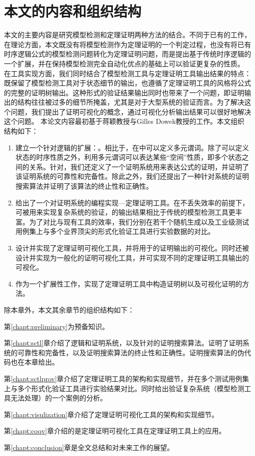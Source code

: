 \section{本文的内容和组织结构}
本文的主要内容是研究模型检测和定理证明两种方法的结合。不同于已有的工作，在理论方面，本文既没有将模型检测作为定理证明的一个判定过程，也没有将已有时序逻辑公式的模型检测问题转化为定理证明问题，而是提出基于传统时序逻辑的一个扩展，并在保持模型检测完全自动化优点的基础上可以验证更复杂的性质。
在工具实现方面，我们同时结合了模型检测工具与定理证明工具输出结果的特点：既保留了模型检测工具对于状态细节的输出，也遵循了定理证明工具的风格将公式的完整的证明树输出。这种形式的验证结果输出同时也带来了一个问题，即证明输出的结构往往被过多的细节所掩盖，尤其是对于大型系统的验证而言。为了解决这个问题，我们提出了证明可视化的概念，通过可视化分析输出结果可以很好地解决这个问题。
本论文内容最初基于蒋颖教授与Gilles Dowek教授的工作\cite{GY13}。本文组织结构如下：
\begin{enumerate}
	\item 建立一个针对\CTL{}逻辑的扩展：\CTLP{}。相比于\CTL{}，在\CTLP{}中可以定义多元谓词。除了可以定义状态的时序性质之外，利用多元谓词可以表达某些“空间”性质，即多个状态之间的关系。针对\CTLP{}，我们还定义了一个证明系统\SCTL{}用来表达\CTLP{}公式的证明，并证明了该证明系统的可靠性和完备性。除此之外，我们还提出了一种针对\SCTL{}系统的证明搜索算法并证明了该算法的终止性和正确性。
	\item 给出了一个对证明系统\SCTL{}的编程实现---定理证明工具\sctlprov{}。在不丢失效率的前提下，\sctlprov{}可被用来实现复杂系统的验证，\sctlprov{}的输出结果相比于传统的模型检测工具更丰富。为了对比\sctlprov{}与现有工具的效率，我们分别在若干个随机生成以及工业级测试用例集上与多个业界顶尖的形式化验证工具进行实验数据的对比。
	\item 设计并实现了定理证明可视化工具，并将用于\sctlprov{}的证明输出的可视化。同时还被设计并实现为一般化的证明可视化工具，并可实现不同的定理证明工具输出的可视化。
	\item 作为一个扩展性工作，实现了定理证明工具中构造证明树以及可视化证明的方法。
\end{enumerate}

除本章外，本文其余章节的组织结构如下：

第\ref{chapt:preliminary}为预备知识。

第\ref{chapt:sctl}章介绍了\CTLP{}逻辑和证明系统\SCTL{}，以及针对\SCTL{}的证明搜索算法。证明了\SCTL{}证明系统的可靠性和完备性，以及证明搜索算法的终止性和正确性。证明搜索算法的伪代码也在本章给出。


第\ref{chapt:sctlprov}章介绍了定理证明工具\sctlprov{}的架构和实现细节，并在多个测试用例集上与多个形式化验证工具进行实验结果对比。同时给出\sctlprov{}验证复杂系统（模型检测工具无法处理）的一个案例的分析。

第\ref{chapt:visulization}章介绍了定理证明可视化工具的架构和实现细节。

第\ref{chapt:coqv}章介绍的是定理证明可视化工具在定理证明工具上的应用。

第\ref{chapt:conclusion}章是全文总结和对未来工作的展望。